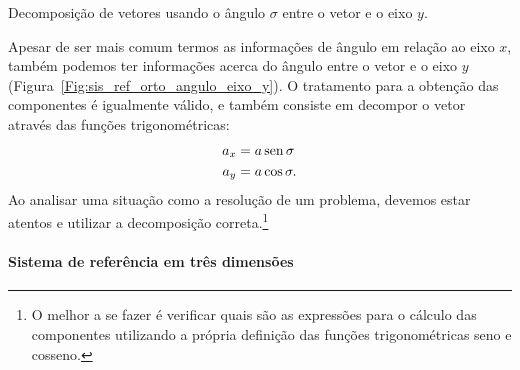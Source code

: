 \begin{marginfigure}[-2cm]
\centering
{}
\caption{Decomposição de vetores usando o ângulo $\sigma$ entre o vetor e o eixo $y$.\label{Fig:sis_ref_orto_angulo_eixo_y}}
\end{marginfigure}

Apesar de ser mais comum termos as informações de ângulo em relação ao eixo $x$, também podemos ter informações acerca do ângulo entre o vetor e o eixo $y$ (Figura~\ref{Fig:sis_ref_orto_angulo_eixo_y}). O tratamento para a obtenção das componentes é igualmente válido, e também consiste em decompor o vetor através das funções trigonométricas:
\begin{align}
    a_x &= a\operatorname{sen}\sigma \\
    a_y &= a\cos\sigma.
\end{align}
%
Ao analisar uma situação como a resolução de um problema, devemos estar atentos e utilizar a decomposição correta.\footnote[][-2.5cm]{O melhor a se fazer é verificar quais são as expressões para o cálculo das componentes utilizando a própria definição das funções trigonométricas seno e cosseno.}

\paragraph{Sistema de referência em três dimensões}

